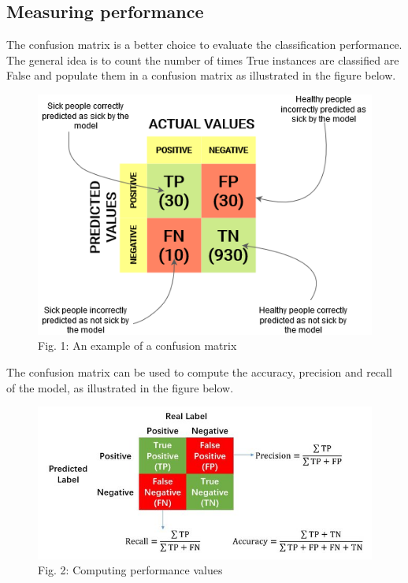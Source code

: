 \documentclass[
]{article}
\begin{document}
\hypertarget{measuring-performance}{%
\subsection{Measuring performance}\label{measuring-performance}}

The confusion matrix is a better choice to evaluate the classification
performance. The general idea is to count the number of times True
instances are classified are False and populate them in a confusion
matrix as illustrated in the figure below.

\begin{figure}
\centering
\includegraphics{img/confusion_matrix.png}
\caption{Fig. 1: An example of a confusion matrix}
\end{figure}

The confusion matrix can be used to compute the accuracy, precision and
recall of the model, as illustrated in the figure below.

\begin{figure}
\centering
\includegraphics{img/compute.jpeg}
\caption{Fig. 2: Computing performance values}
\end{figure}
\end{document}
